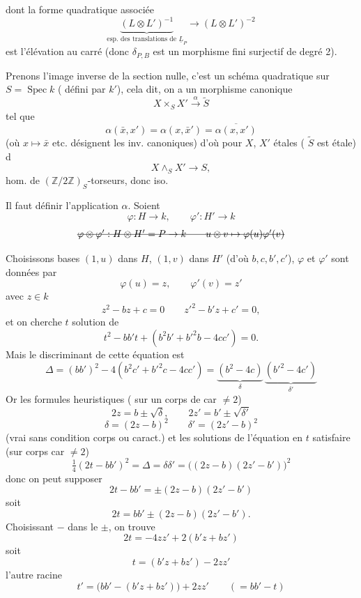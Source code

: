 \documentclass[11pt,a4paper]{article}
\begin{document}
dont la forme quadratique associée
\[ \underbrace{(L\otimes L')^{-1}}_{\text{esp. des translations de } \underline{L}_P} \longrightarrow (L\otimes L')^{-2} \]
est l'élévation au carré (donc $\delta_{P,B}$ est  un morphisme fini surjectif de degré 2).

Prenons l'image inverse de la section nulle, c'est un schéma quadratique  sur $S=\operatorname{Spec} k$ ( défini par  $k'$), cela dit, on a un morphisme canonique
\[ \boxed{\, X\times_S X' \xrightarrow{\ \alpha\ } \tilde{S} \,} \]
 tel que
\[ \alpha(\bar{x},x') = \alpha(x,\bar{x}') = \overline{\alpha(x,x')} \]
(où $x\mapsto\bar{x}$ etc. désignent les inv. canoniques) d'où pour $X$, $X'$ étales ( $\tilde{S}$ est étale) d 
\[ X\wedge_S X' \longrightarrow S , \]
 hom. de $(\mathbb{Z}/2\mathbb{Z})_S$-torseurs, donc iso.

Il faut définir l'application $\alpha$. Soient
\[ \varphi : H\to k , \qquad \varphi' : H'\to k \]
\[ \text{\struck{$\varphi\otimes\varphi' : H\otimes H' = P\to k \qquad u\otimes v\mapsto \varphi(u)\varphi'(v)$}} \]

Choisissons bases $(1,u)$ dans $H$, $(1,v)$ dans $H'$ (d'où $b,c,b',c'$), $\varphi$ et $\varphi'$ sont données par
\[ \varphi(u) = z , \qquad \varphi'(v) = z' \]
avec $z\in k$
\[ z^2 - bz + c = 0 \qquad z'^2 - b'z + c' = 0 , \]
et on cherche $t$ solution de
\[ t^2 - bb't + (b^2b' + b'^2b - 4cc') = 0 . \]
Mais le discriminant de cette équation est
\[ \Delta = (bb')^2 - 4(b^2c' + b'^2c - 4cc') = \underbrace{(b^2-4c)}_{\delta}\,\underbrace{(b'^2-4c')}_{\delta'} \]
Or \struck{\ill{}} les formules \struck{\ill{}} heuristiques ( sur un corps de car $\neq2$)
\[ 2z = b\pm\sqrt{\delta} , \qquad 2z' = b'\pm\sqrt{\delta'} \]
\[ \delta = (2z-b)^2 \qquad \delta' = (2z'-b)^2 \]
(vrai sans condition corps ou caract.) et les solutions de l'équation en $t$  satisfaire (sur corps car $\neq2$)
\[ \tfrac14 (2t-bb')^2 = \Delta = \delta\delta' = \bigl((2z-b)(2z'-b')\bigr)^2 \]
donc on peut  supposer
\[ 2t - bb' = \pm(2z-b)(2z'-b') \]
soit
\[ 2t = bb' \pm (2z-b)(2z'-b') . \]
Choisissant $-$ dans \struck{\ill{}} le $\pm$, on trouve
\[ 2t = -4zz' + 2(b'z+bz') \]
soit
\[ \boxed{\, t = (b'z+bz') - 2zz' \,} \]
l'autre racine 
\[ t' = \bigl(bb' - (b'z+bz')\bigr) + 2zz' \qquad (= bb'-t) \]
\end{document}
